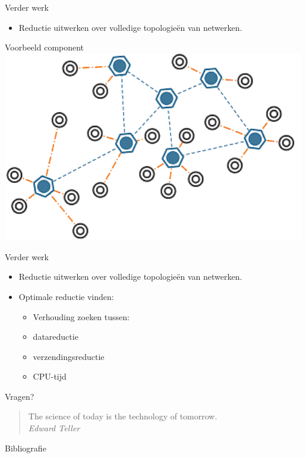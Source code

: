 \documentclass[presentation, bigger]{beamer}
\begin{document}
\begin{frame}{Verder werk}
  \begin{itemize}
  \item Reductie uitwerken over volledige topologieën van netwerken.
  \end{itemize}
\end{frame}
\begin{frame}{Voorbeeld component}
\includegraphics[width=0.99\textwidth,keepaspectration=true]{wsn}
\end{frame}

\begin{frame}{Verder werk}
  \begin{itemize}
  \item Reductie uitwerken over volledige topologieën van netwerken.
  \item Optimale reductie vinden:
   \begin{itemize}
        \item[] Verhouding zoeken tussen:
  		\item datareductie
  		\item verzendingsreductie
  		\item CPU-tijd
  		\end{itemize}
  \end{itemize}
\end{frame}

\begin{frame}{Vragen?}
\begin{quote}
The science of today is the technology of tomorrow.\\
\raggedleft \textit{Edward Teller}
\end{quote}
\end{frame}

\begin{frame}[allowframebreaks]{Bibliografie}

  \nocite{*}
  \printbibliography
\end{frame}
\end{document}
